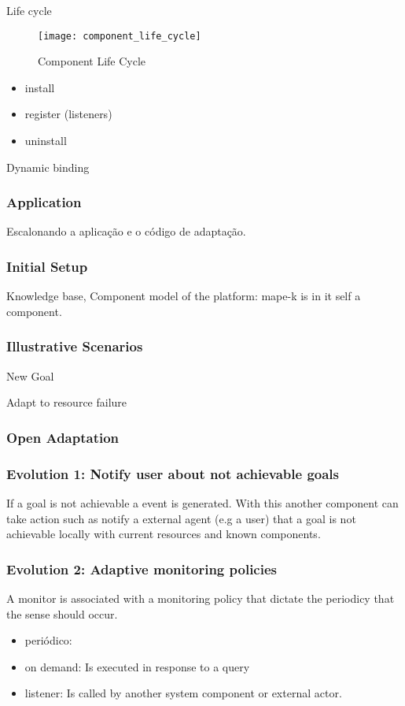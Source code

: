 Life cycle

\begin{figure}[!htb]
  \centering
  \texttt{[image: component\_life\_cycle]}
  \caption{Component Life Cycle}
\label{fig:component_life_cycle}
\end{figure}


\begin{itemize}
  \item install
  \item register (listeners)
  \item uninstall
\end{itemize}

Dynamic binding

\subsubsection{Application}

Escalonando a aplicação e o código de adaptação.

\subsubsection{Initial Setup}

Knowledge base,
Component model of the platform: mape-k is in it self a component.



\subsubsection{Illustrative Scenarios}
New Goal

Adapt to resource failure


\subsubsection{Open Adaptation}

\subsubsection{Evolution 1: Notify user about not achievable goals}
If a goal is not achievable a event is generated. With this another component can take action such as notify a external agent (e.g a user) that a goal is not achievable locally with current resources and known components.


\subsubsection{Evolution 2: Adaptive monitoring policies}
A monitor is associated with a monitoring policy that dictate the periodicy that the sense should occur.
\begin{itemize}
  \item periódico:
  \item on demand: Is executed in response to a query
  \item listener: Is called by another system component or external actor.
\end{itemize}



